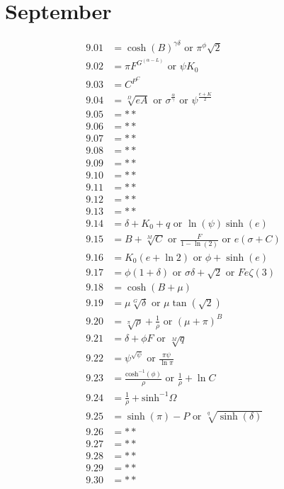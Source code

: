 \documentclass[12pt]{article}
\newcommand{\acosh}{\text{cosh}^{-1}}
\newcommand{\asinh}{\text{sinh}^{-1}}
\newcommand{\oder}{\text{ or }}
\begin{document}
\pagebreak
 
\section{September}
\begin{align*}
9.01 &= \cosh(B)^{\gamma \delta} \oder \pi^{\phi}\sqrt{2}\\
9.02 &= \pi F^{G^{(\alpha - L)}} \oder \psi K_{0}\\
9.03 &= C^{P^{C}}\\
9.04 &= \sqrt[\Omega]{e A} \oder \sigma^{\frac{\alpha}{\gamma}} \oder \psi^{\frac{e + K}{2}}\\
9.05 &= **\\
9.06 &= **\\
9.07 &= **\\
9.08 &= **\\
9.09 &= **\\
9.10 &= **\\
9.11 &= **\\
9.12 &= **\\
9.13 &= **\\
9.14 &= \delta+K_{0}+q \oder \ln(\psi) \sinh(e)\\
9.15 &= B+\sqrt[M]{C} \oder \frac{F}{1-\ln(2)} \oder e \left(\sigma+C\right)\\
9.16 &= K_{0} \left(e+\ln{2}\right) \oder \phi+\sinh(e)\\
9.17 &= \phi(1 + \delta) \oder \sigma \delta+\sqrt{2} \oder Fe\zeta(3)\\
9.18 &= \cosh(B+\mu)\\
9.19 &= \mu \sqrt[G]{\delta} \oder \mu \tan\left(\sqrt{2}\right)\\
9.20 &= \sqrt[\pi]{\rho}+\frac{1}{\rho} \oder (\mu + \pi)^{B}\\
9.21 &= \delta+\phi F \oder \sqrt[M]{q}\\
9.22 &= \psi^{\sqrt{\psi}} \oder \frac{\pi \psi}{\ln \pi}\\
9.23 &= \frac{\acosh(\phi)}{\rho} \oder \frac{1}{\rho}+\ln C\\
9.24 &= \frac{1}{\rho}+\asinh\Omega\\
9.25 &= \sinh(\pi)-P \oder \sqrt[q]{\sinh(\delta)}\\
9.26 &= **\\
9.27 &= **\\
9.28 &= **\\
9.29 &= **\\
9.30 &= **\\
\end{align*}
\end{document}

